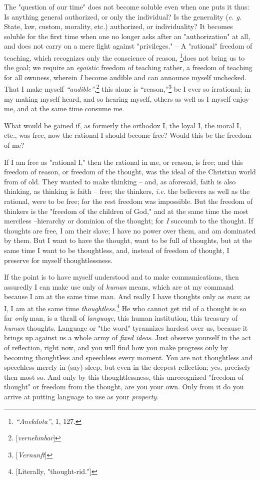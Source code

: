 The "{}question of our time"{} does not become soluble even when one puts it 
thus: Is anything general authorized, or only the individual? Is the 
generality (\textit{e. g.} State, law, custom, morality, etc.) authorized, or 
individuality? It becomes soluble for the first time when one no longer asks 
after an "{}authorization"{} at all, and does not carry on a mere fight 
against "{}privileges."{} -- A "{}rational"{} freedom of teaching, which 
recognizes only the conscience of reason, \footnote{\textit{``Anekdota''}, 
1, 127. }does not bring us to the goal; we require an \textit{egoistic} 
freedom of teaching rather, a freedom of teaching for all ownness, wherein 
\textit{I} become audible and can announce myself unchecked. That I make 
myself \textit{``audible''},\footnote{[\textit{vernehmbar}]} this alone is 
``reason,''\footnote{[\textit{Vernunft}]} be I ever so irrational; in my 
making myself heard, and so hearing myself, others as well as I myself enjoy 
me, and at the same time consume me.

What would be gained if, as formerly the orthodox I, the loyal I, the moral I, 
etc., was free, now the rational I should become free? Would this be the 
freedom of me?

If I am free as "{}rational I,"{} then the rational in me, or reason, is free; 
and this freedom of reason, or freedom of the thought, was the ideal of the 
Christian world from of old. They wanted to make thinking -- and, as 
aforesaid, faith is also thinking, as thinking is faith -- free; the thinkers, 
\textit{i.e.} the believers as well as the rational, were to be free; for the 
rest freedom was impossible. But the freedom of thinkers is the "{}freedom of 
the children of God,"{} and at the same time the most merciless --hierarchy or 
dominion of the thought; for \textit{I} succumb to the thought. If thoughts 
are free, I am their slave; I have no power over them, and am dominated by 
them. But I want to have the thought, want to be full of thoughts, but at the 
same time I want to be thoughtless, and, instead of freedom of thought, I 
preserve for myself thoughtlessness.

If the point is to have myself understood and to make communications, then 
assuredly I can make use only of \textit{human} means, which are at my command 
because I am at the same time man. And really I have thoughts only as 
\textit{man}; as I, I am at the same time 
\textit{thoughtless.}\footnote{[Literally, "{}thought-rid."{}]} He who cannot 
get rid of a thought is so far \textit{only} man, is a thrall of 
\textit{language}, this human institution, this treasury of \textit{human} 
thoughts. Language or "{}the word"{} tyrannizes hardest over us, because it 
brings up against us a whole army of \textit{fixed ideas}. Just observe 
yourself in the act of reflection, right now, and you will find how you make 
progress only by becoming thoughtless and speechless every moment. You are not 
thoughtless and speechless merely in (say) sleep, but even in the deepest 
reflection; yes, precisely then most so. And only by this thoughtlessness, 
this unrecognized "{}freedom of thought"{} or freedom from the thought, are 
you your own. Only from it do you arrive at putting language to use as your 
\textit{property}.

